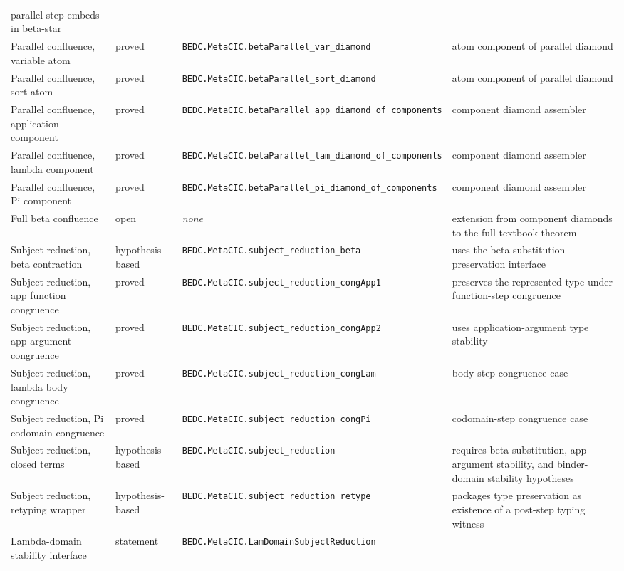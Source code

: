 \begin{longtable}{p{}p{}p{}p{}}
parallel step embeds in beta-star\\
Parallel confluence, variable atom &
proved &
\texttt{BEDC.MetaCIC.betaParallel\_var\_diamond} &
atom component of parallel diamond\\
Parallel confluence, sort atom &
proved &
\texttt{BEDC.MetaCIC.betaParallel\_sort\_diamond} &
atom component of parallel diamond\\
Parallel confluence, application component &
proved &
\texttt{BEDC.MetaCIC.betaParallel\_app\_diamond\_of\_components} &
component diamond assembler\\
Parallel confluence, lambda component &
proved &
\texttt{BEDC.MetaCIC.betaParallel\_lam\_diamond\_of\_components} &
component diamond assembler\\
Parallel confluence, Pi component &
proved &
\texttt{BEDC.MetaCIC.betaParallel\_pi\_diamond\_of\_components} &
component diamond assembler\\
Full beta confluence &
open &
\textit{none} &
extension from component diamonds to the full textbook theorem\\
Subject reduction, beta contraction &
hypothesis-based &
\texttt{BEDC.MetaCIC.subject\_reduction\_beta} &
uses the beta-substitution preservation interface\\
Subject reduction, app function congruence &
proved &
\texttt{BEDC.MetaCIC.subject\_reduction\_congApp1} &
preserves the represented type under function-step congruence\\
Subject reduction, app argument congruence &
proved &
\texttt{BEDC.MetaCIC.subject\_reduction\_congApp2} &
uses application-argument type stability\\
Subject reduction, lambda body congruence &
proved &
\texttt{BEDC.MetaCIC.subject\_reduction\_congLam} &
body-step congruence case\\
Subject reduction, Pi codomain congruence &
proved &
\texttt{BEDC.MetaCIC.subject\_reduction\_congPi} &
codomain-step congruence case\\
Subject reduction, closed terms &
hypothesis-based &
\texttt{BEDC.MetaCIC.subject\_reduction} &
requires beta substitution, app-argument stability, and binder-domain stability hypotheses\\
Subject reduction, retyping wrapper &
hypothesis-based &
\texttt{BEDC.MetaCIC.subject\_reduction\_retype} &
packages type preservation as existence of a post-step typing witness\\
Lambda-domain stability interface &
statement &
\texttt{BEDC.MetaCIC.LamDomainSubjectReduction} &

\end{longtable}
